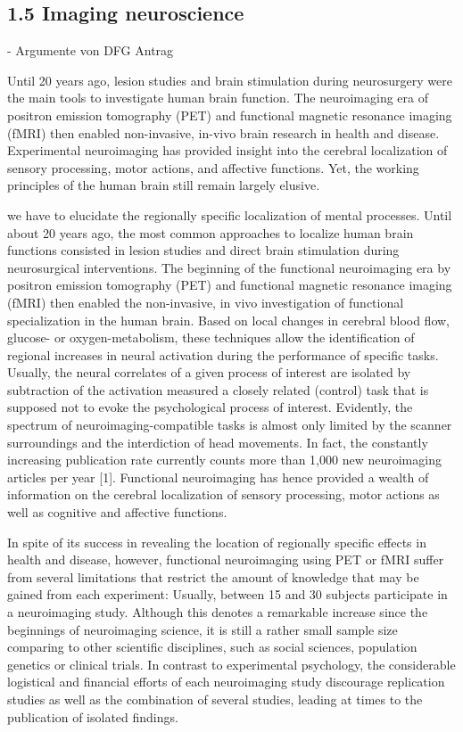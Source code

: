 \documentclass[authoryear,review,3p]{elsarticle}
\begin{document}
\subsection*{1.5 Imaging neuroscience}



- Argumente von DFG Antrag

Until 20 years ago, lesion studies and brain stimulation during neurosurgery were the main tools to investigate human brain function. The neuroimaging era of positron emission tomography (PET) and functional magnetic resonance imaging (fMRI) then enabled non-invasive, in-vivo brain research in health and disease. Experimental neuroimaging has provided insight into the cerebral localization of sensory processing, motor actions, and affective functions. Yet, the working principles of the human brain still remain largely elusive.


we have to elucidate the regionally specific localization of mental processes. Until about 20 years ago, the most common approaches to localize human brain functions consisted in lesion studies and direct brain stimulation during neurosurgical interventions. The beginning of the functional neuroimaging era by positron emission tomography (PET) and functional magnetic resonance imaging (fMRI) then enabled the non-invasive, in vivo investigation of functional specialization in the human brain. Based on local changes in cerebral blood flow, glucose- or oxygen-metabolism, these techniques allow the identification of regional increases in neural activation during the performance of specific tasks. Usually, the neural correlates of a given process of interest are isolated by subtraction of the activation measured a closely related (control) task that is supposed not to evoke the psychological process of interest. Evidently, the spectrum of neuroimaging-compatible tasks is almost only limited by the scanner surroundings and the interdiction of head movements. In fact, the constantly increasing publication rate currently counts more than 1,000 new neuroimaging articles per year [1]. Functional neuroimaging has hence provided a wealth of information on the cerebral localization of sensory processing, motor actions as well as cognitive and affective functions.

In spite of its success in revealing the location of regionally specific effects in health and disease, however, functional neuroimaging using PET or fMRI suffer from several limitations that restrict the amount of knowledge that may be gained from each experiment:
Usually, between 15 and 30 subjects participate in a neuroimaging study. Although this denotes a remarkable increase since the beginnings of neuroimaging science, it is still a rather small sample size comparing to other scientific disciplines, such as social sciences, population genetics or clinical trials. In contrast to experimental psychology, the considerable logistical and financial efforts of each neuroimaging study discourage replication studies as well as the combination of several studies, leading at times to the publication of isolated findings.
\end{document}
